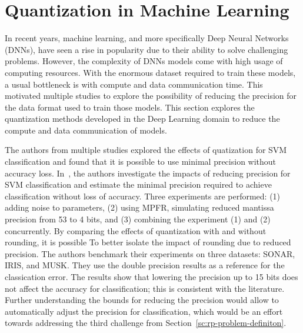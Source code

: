 \section{Quantization in Machine Learning}
In recent years, machine learning, and more specifically Deep Neural Networks (DNNs),
have seen a rise in popularity due to their ability to solve challenging problems.
However, the complexity of DNNs models come with high usage of computing resources.
With the enormous dataset required to train these models, a usual bottleneck is with compute and data communication time.
This motivated multiple studies \cite{Johnson2018-up,Wang2018-oo,Lesser2011-mn,Chen2018-an,Judd2015-kw,Vicuna2021-mw}
to explore the possibility of reducing the precision for the data format used to train those models.
This section explores the quantization methods developed in the Deep Learning 
domain to reduce the compute and data communication of models.

The authors from multiple studies explored the effects of quatization for SVM classification
and found that it is possible to use minimal precision without accuracy loss.
In~\cite{Lesser2011-mn}, the authors investigate the impacts of reducing precision for SVM
classification and estimate the minimal precision required to achieve classification 
without loss of accuracy. Three experiments are performed: 
(1) adding noise to parameters,
(2) using MPFR, simulating reduced mantissa precision from 53 to 4 bits,
and (3) combining the experiment (1) and (2) concurrently.
By comparing the effects of quantization with and without rounding, it is possible To
better isolate the impact of rounding due to reduced precision.
The authors benchmark their experiments on three datasets: SONAR, IRIS, and MUSK.
They use the double precision results as a reference for the classication error.
The results show that lowering the precision up to 15 bits does not affect the accuracy
for classification; this is consistent with the literature.
Further understanding the bounds for reducing the precision would allow to automatically
adjust the precision for classification, which would be an effort towards addressing the third 
challenge from Section~\ref{sc:rp-problem-definiton}.

